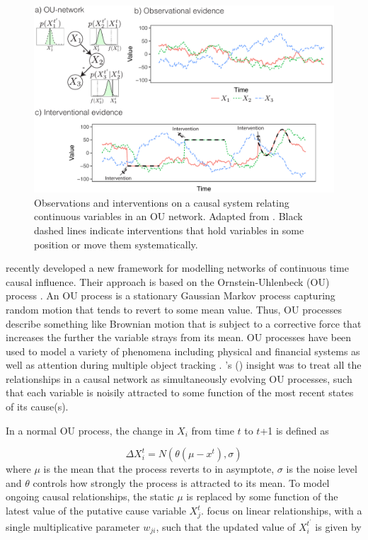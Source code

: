 \documentclass{cambridge7A}%
\def\citeapos#1{\citeauthor{#1}'s (\citeyear{#1})}
\begin{document}
\begin{figure}[t]
   \centering
   \includegraphics[width = \columnwidth]{OU}
   \caption{Observations and interventions on a causal system relating continuous variables in an OU network.  Adapted from \cite{davis2018ctcv}.    Black dashed lines indicate interventions that hold variables in some position or move them systematically.}
   \label{fig:OU}
\end{figure}

\cite{davis2018ctcv} recently developed a new framework for modelling networks of continuous time causal influence.  Their approach is based on the Ornstein-Uhlenbeck (OU) process \citep{uhlenbeck1930theory}.  An OU process is a stationary Gaussian Markov process capturing random motion that tends to revert to some mean value.  Thus, OU processes describe something like Brownian motion that is subject to a corrective force that increases the further the variable strays from its mean. OU processes have been used to model a variety of phenomena including physical \citep{lacko2012planning} and financial \citep{barndorff2001non} systems as well as attention during multiple object tracking \citep{vul2009explaining}.  \citeapos{davis2018ctcv} insight was to treat all the relationships in a causal network as simultaneously evolving OU processes, such that each variable is noisily attracted to some function of the most recent states of its cause(s).  

In a normal OU process, the change in $X_i$ from time $t$ to $t$+1 is defined as

\begin{equation}
\Delta X_i^t =  N(\theta(\mu - x^t),\sigma)
\end{equation}
where $\mu$ is the mean that the process reverts to in asymptote, $\sigma$ is the noise level and $\theta$ controls how strongly the process is attracted to its mean.  To model ongoing causal relationships, the static $\mu$ is replaced by some function of the latest value of the putative cause variable $X^t_j$.  \cite{davis2018ctcv} focus on linear relationships, with a single multiplicative parameter $w_{ji}$, such that the updated value of $X_i^{t^{\prime}}$ is given by
\end{document}
